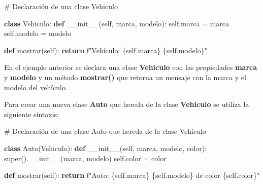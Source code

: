 \documentclass[
  a4paper,
  DIV=11,
  numbers=noendperiod,
  onepage,
  openany]{scrreprt}
\newenvironment{Shaded}{\begin{snugshade}}{\end{snugshade}}
\newcommand{\BuiltInTok}[1]{\textcolor[rgb]{0.00,0.23,0.31}{#1}}
\newcommand{\CommentTok}[1]{\textcolor[rgb]{0.37,0.37,0.37}{#1}}
\newcommand{\ControlFlowTok}[1]{\textcolor[rgb]{0.00,0.23,0.31}{\textbf{#1}}}
\newcommand{\FunctionTok}[1]{\textcolor[rgb]{0.28,0.35,0.67}{#1}}
\newcommand{\KeywordTok}[1]{\textcolor[rgb]{0.00,0.23,0.31}{\textbf{#1}}}
\newcommand{\NormalTok}[1]{\textcolor[rgb]{0.00,0.23,0.31}{#1}}
\newcommand{\OperatorTok}[1]{\textcolor[rgb]{0.37,0.37,0.37}{#1}}
\newcommand{\SpecialCharTok}[1]{\textcolor[rgb]{0.37,0.37,0.37}{#1}}
\newcommand{\SpecialStringTok}[1]{\textcolor[rgb]{0.13,0.47,0.30}{#1}}
\newcommand{\VariableTok}[1]{\textcolor[rgb]{0.07,0.07,0.07}{#1}}
\begin{document}
\begin{Shaded}
\begin{Highlighting}[]
\CommentTok{\# Declaración de una clase Vehiculo}

\KeywordTok{class}\NormalTok{ Vehiculo:}
    \KeywordTok{def} \FunctionTok{\_\_init\_\_}\NormalTok{(}\VariableTok{self}\NormalTok{, marca, modelo):}
        \VariableTok{self}\NormalTok{.marca }\OperatorTok{=}\NormalTok{ marca}
        \VariableTok{self}\NormalTok{.modelo }\OperatorTok{=}\NormalTok{ modelo}

    \KeywordTok{def}\NormalTok{ mostrar(}\VariableTok{self}\NormalTok{):}
        \ControlFlowTok{return} \SpecialStringTok{f"Vehículo: }\SpecialCharTok{\{}\VariableTok{self}\SpecialCharTok{.}\NormalTok{marca}\SpecialCharTok{\}}\SpecialStringTok{ }\SpecialCharTok{\{}\VariableTok{self}\SpecialCharTok{.}\NormalTok{modelo}\SpecialCharTok{\}}\SpecialStringTok{"}
\end{Highlighting}
\end{Shaded}

En el ejemplo anterior se declara una clase \textbf{Vehiculo} con las
propiedades \textbf{marca} y \textbf{modelo} y un método
\textbf{mostrar()} que retorna un mensaje con la marca y el modelo del
vehículo.

Para crear una nueva clase \textbf{Auto} que hereda de la clase
\textbf{Vehiculo} se utiliza la siguiente sintaxis:

\begin{Shaded}
\begin{Highlighting}[]
\CommentTok{\# Declaración de una clase Auto que hereda de la clase Vehiculo}

\KeywordTok{class}\NormalTok{ Auto(Vehiculo):}
    \KeywordTok{def} \FunctionTok{\_\_init\_\_}\NormalTok{(}\VariableTok{self}\NormalTok{, marca, modelo, color):}
        \BuiltInTok{super}\NormalTok{().}\FunctionTok{\_\_init\_\_}\NormalTok{(marca, modelo)}
        \VariableTok{self}\NormalTok{.color }\OperatorTok{=}\NormalTok{ color}

    \KeywordTok{def}\NormalTok{ mostrar(}\VariableTok{self}\NormalTok{):}
        \ControlFlowTok{return} \SpecialStringTok{f"Auto: }\SpecialCharTok{\{}\VariableTok{self}\SpecialCharTok{.}\NormalTok{marca}\SpecialCharTok{\}}\SpecialStringTok{ }\SpecialCharTok{\{}\VariableTok{self}\SpecialCharTok{.}\NormalTok{modelo}\SpecialCharTok{\}}\SpecialStringTok{ de color }\SpecialCharTok{\{}\VariableTok{self}\SpecialCharTok{.}\NormalTok{color}\SpecialCharTok{\}}\SpecialStringTok{"}
\end{Highlighting}
\end{Shaded}
\end{document}
